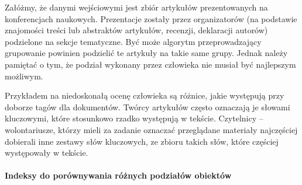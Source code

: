 \documentclass{article}
\newcommand{\myparagraph}[1]{\paragraph{#1}\mbox{}\\}
\begin{document}
Załóżmy, że danymi wejściowymi jest zbiór artykułów prezentowanych na konferencjach naukowych. Prezentacje zostały przez organizatorów (na podstawie znajomości treści lub abstraktów artykułów, recenzji, deklaracji autorów) podzielone na sekcje tematyczne. Być może algorytm przeprowadzający grupowanie powinien podzielić te artykuły na takie same grupy. Jednak należy pamiętać o tym, że podział wykonany przez człowieka nie musiał być najlepszym możliwym. 

Przykładem na niedoskonałą ocenę człowieka są różnice, jakie występują przy doborze tagów dla dokumentów. Twórcy artykułów często oznaczają je słowami kluczowymi, które stosunkowo rzadko występują w tekście. Czytelnicy – wolontariusze, którzy mieli za zadanie oznaczać przeglądane materiały najczęściej dobierali inne zestawy słów kluczowych, ze zbioru takich słów, które częściej występowały w tekście\cite{user_experts_tags}.

\myparagraph{Indeksy do porównywania różnych podziałów obiektów}
\end{document}
